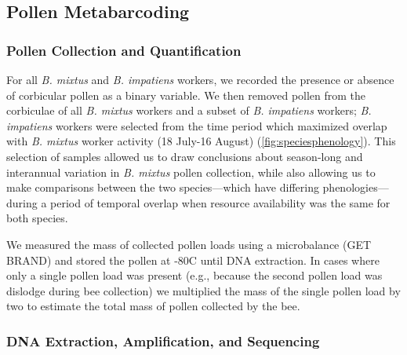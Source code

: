 \documentclass[12pt]{article}
\begin{document}
\subsection{Pollen Metabarcoding}
\subsubsection{Pollen Collection and Quantification}
For all \emph{B. mixtus} and \emph{B. impatiens} workers, we recorded the presence or absence of corbicular pollen as a binary variable. We then removed pollen from the corbiculae of all \emph{B. mixtus} workers and a subset of \emph{B. impatiens} workers; \emph{B. impatiens} workers were selected from the time period which maximized overlap with \emph{B. mixtus} worker activity (18 July-16 August) (\autoref{fig:speciesphenology}). This selection of samples allowed us to draw conclusions about season-long and interannual variation in \emph{B. mixtus} pollen collection, while also allowing us to make comparisons between the two species---which have differing phenologies---during a period of temporal overlap when resource availability was the same for both species. 

We measured the mass of collected pollen loads using a microbalance (GET BRAND) and stored the pollen at -80\degree C until DNA extraction. In cases where only a single pollen load was present (e.g., because the second pollen load was dislodge during bee collection) we multiplied the mass of the single pollen load by two to estimate the total mass of pollen collected by the bee.

\subsubsection{DNA Extraction, Amplification, and Sequencing}
\end{document}
